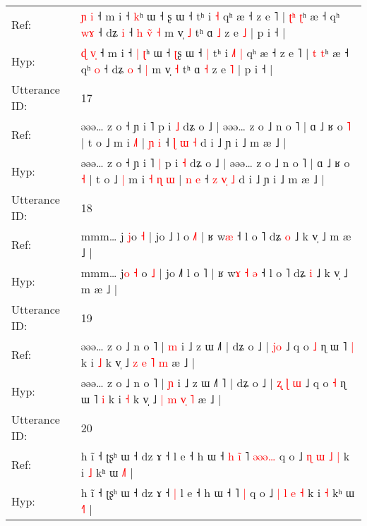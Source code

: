 \documentclass[10pt]{article}
\DeclareRobustCommand{\hl}[1]{{\textcolor{red}{#1}}}
\begin{document}
\begin{longtable}{ll}
Ref: & \hl{ɲ} \hl{}\hl{i} ˧ m i ˧\hl{}\hl{} \hl{k}ʰ ɯ ˧ \hl{}ʂ ɯ ˧\hl{}\hl{} tʰ i\hl{}\hl{}\hl{} \hl{˧} qʰ æ ˧ z e ˥ | \hl{ʈ}\hl{ʰ} \hl{ʈ}ʰ æ ˧ qʰ \hl{w}\hl{ɤ} ˧ dʑ \hl{i} ˧\hl{ }\hl{h}\hl{ }\hl{v}\hl{̃} \hl{˧} m v̩ \hl{˩} tʰ ɑ \hl{˩} z e \hl{˩} | p i ˧ |
 \\
Hyp: & \hl{ɖ} \hl{v}\hl{̩} ˧ m i ˧\hl{ }\hl{|} \hl{ʈ}ʰ ɯ ˧ \hl{ʈ}ʂ ɯ ˧\hl{ }\hl{|} tʰ i\hl{ }\hl{˩}\hl{˥} \hl{|} qʰ æ ˧ z e ˥ | \hl{}\hl{t} \hl{t}ʰ æ ˧ qʰ \hl{}\hl{o} ˧ dʑ \hl{o} ˧\hl{}\hl{}\hl{}\hl{}\hl{} \hl{|} m v̩ \hl{˧} tʰ ɑ \hl{˧} z e \hl{˥} | p i ˧ |
 \\
\midrule
Utterance ID: & 17 \\
Ref: & əəə… z o ˧ ɲ i ˥\hl{}\hl{} p i \hl{˩} dʑ o ˩ | əəə… z o ˩ n o ˥ | ɑ ˩ ʁ o \hl{˥} | t o ˩\hl{}\hl{} m i\hl{}\hl{} \hl{}\hl{˩}\hl{˥} | \hl{ɲ} \hl{i} ˧ \hl{ɭ} \hl{}\hl{ɯ} \hl{˧} d i ˩ ɲ i ˩ m æ ˩ |
 \\
Hyp: & əəə… z o ˧ ɲ i ˥\hl{ }\hl{|} p i \hl{˧} dʑ o ˩ | əəə… z o ˩ n o ˥ | ɑ ˩ ʁ o \hl{˧} | t o ˩\hl{ }\hl{|} m i\hl{ }\hl{˧} \hl{ɳ}\hl{ }\hl{ɯ} | \hl{n} \hl{e} ˧ \hl{z} \hl{v}\hl{̩} \hl{˩} d i ˩ ɲ i ˩ m æ ˩ |
 \\
\midrule
Utterance ID: & 18 \\
Ref: & mmm… j\hl{} \hl{}\hl{j}o \hl{˧} | jo ˩\hl{} l o \hl{˩}˥ | ʁ w\hl{}\hl{}\hl{}\hl{}\hl{æ} ˧ l o ˥ dʑ \hl{o} ˩ k v̩ ˩ m æ ˩ |
 \\
Hyp: & mmm… j\hl{o} \hl{˧}\hl{ }o \hl{˩} | jo ˩\hl{˥} l o \hl{}˥ | ʁ w\hl{ɤ}\hl{ }\hl{˧}\hl{ }\hl{ə} ˧ l o ˥ dʑ \hl{i} ˩ k v̩ ˩ m æ ˩ |
 \\
\midrule
Utterance ID: & 19 \\
Ref: & əəə… z o ˩ n o ˥ | \hl{m} i ˩ z ɯ ˩\hl{}\hl{}˥ | dʑ o ˩ |\hl{}\hl{} \hl{}\hl{j}\hl{o} ˩ q o \hl{˩} ɳ ɯ ˥ \hl{|} k i \hl{˩} k v̩ ˩ \hl{z} \hl{e} \hl{}\hl{˥} \hl{m} æ ˩ |
 \\
Hyp: & əəə… z o ˩ n o ˥ | \hl{ɲ} i ˩ z ɯ ˩\hl{˥}\hl{ }˥ | dʑ o ˩ |\hl{ }\hl{ʐ} \hl{ɭ}\hl{ }\hl{ɯ} ˩ q o \hl{˧} ɳ ɯ ˥ \hl{i} k i \hl{˧} k v̩ ˩ \hl{|} \hl{m} \hl{v}\hl{̩} \hl{˥} æ ˩ |
 \\
\midrule
Utterance ID: & 20 \\
Ref: & h ĩ ˧ ʈʂʰ ɯ ˧ dz ɤ ˧\hl{}\hl{} l e ˧ h ɯ ˧\hl{ }\hl{h}\hl{ }\hl{i}\hl{̃} ˥ \hl{ə}\hl{ə}\hl{ə}\hl{…} q o ˩ \hl{ɳ} \hl{ɯ} \hl{˩} \hl{|} k i \hl{˩} kʰ ɯ \hl{˩}˥ |
 \\
Hyp: & h ĩ ˧ ʈʂʰ ɯ ˧ dz ɤ ˧\hl{ }\hl{|} l e ˧ h ɯ ˧\hl{}\hl{}\hl{}\hl{}\hl{} ˥ \hl{}\hl{}\hl{}\hl{|} q o ˩ \hl{|} \hl{l} \hl{e} \hl{˧} k i \hl{˧} kʰ ɯ \hl{˧}˥ |
 \\

\end{longtable}
\end{document}
